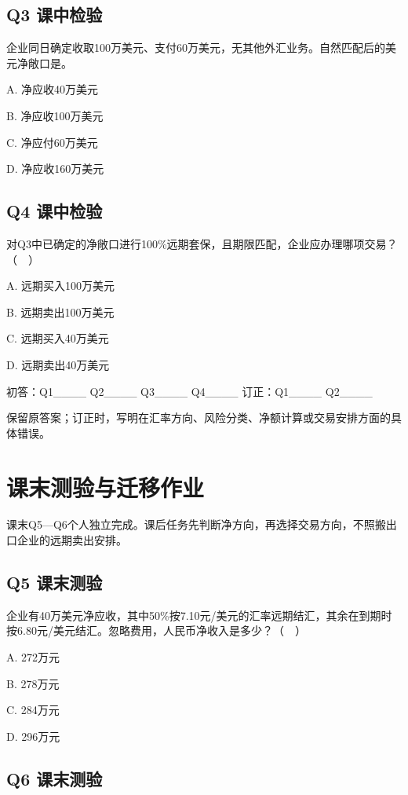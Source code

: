 \documentclass[lang=cn,11pt,oneside,openany,chinesefont=nofont,color=blue,titlestyle=hang]{elegantbook}
\begin{document}
\subsection*{Q3  课中检验}

企业同日确定收取100万美元、支付60万美元，无其他外汇业务。自然匹配后的美元净敞口是。

A. 净应收40万美元

B. 净应收100万美元

C. 净应付60万美元

D. 净应收160万美元

\subsection*{Q4  课中检验}

对Q3中已确定的净敞口进行100\%远期套保，且期限匹配，企业应办理哪项交易？（　）

A. 远期买入100万美元

B. 远期卖出100万美元

C. 远期买入40万美元

D. 远期卖出40万美元

初答：Q1\_\_\_\_ Q2\_\_\_\_ Q3\_\_\_\_ Q4\_\_\_\_    订正：Q1\_\_\_\_ Q2\_\_\_\_\par\noindent 保留原答案；订正时，写明在汇率方向、风险分类、净额计算或交易安排方面的具体错误。
\endgroup

\clearpage

\section{课末测验与迁移作业}\label{sec:g17}

课末Q5—Q6个人独立完成。课后任务先判断净方向，再选择交易方向，不照搬出口企业的远期卖出安排。

\subsection*{Q5  课末测验}

企业有40万美元净应收，其中50\%按7.10元/美元的汇率远期结汇，其余在到期时按6.80元/美元结汇。忽略费用，人民币净收入是多少？（　）

A. 272万元

B. 278万元

C. 284万元

D. 296万元

\subsection*{Q6  课末测验}
\end{document}
